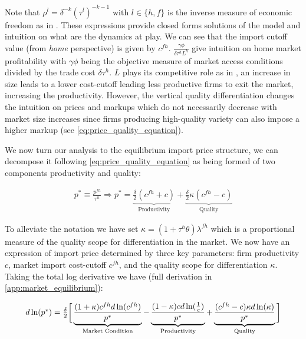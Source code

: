 {Note that $\rho^l = \delta^{-k}(\tau^l)^{-k-1} \text{ with } l \in \{h,f\}$ is the inverse measure of economic freedom as in \citet{melitzMarketSizeTrade2008}. These expressions provide closed forms solutions of the model and intuition on what are the dynamics at play. We can see that the import cutoff value (from \textit{home} perspective) is given by $c^{fh}$. $\frac{\gamma \phi}{\delta \tau^h L^h}$ give intuition on home market profitability with $\gamma \phi$ being the objective measure of market access conditions divided by the trade cost $\delta \tau^h$. $L$ plays its competitive role as in \citet{melitzMarketSizeTrade2008}, an increase in size leads to a lower cost-cutoff leading less productive firms to exit the market, increasing the productivity. However, the vertical quality differentiation changes the intuition on prices and markups which do not necessarily decrease with market size increases since firms producing high-quality variety can also impose a higher markup (see \autoref{eq:price_quality_equation}).

We now turn our analysis to the equilibrium import price structure, we can decompose it following \autoref{eq:price_quality_equation} as being formed of two components productivity and quality: 

\begin{equation} \label{eq:optimal_import_price}
    \begin{aligned}
        p^* \equiv \frac{p^{fh}}{\tau^h} \Longrightarrow p^* = \underbrace{\frac{\delta}{2} ( c^{fh} +  c)}_{\text{Productivity}} + \underbrace{\frac{\delta}{2} \kappa (c^{fh} - c)}_{\text{Quality}}
    \end{aligned}
\end{equation}

To alleviate the notation we have set $\kappa = (1 + \tau^h\theta)\lambda^{fh}$ which is a proportional measure of the quality scope for differentiation in the market. We now have an expression of import price determined by three key parameters: firm productivity $c$, market import cost-cutoff $c^{fh}$, and the quality scope for differentiation $\kappa$. Taking the total log derivative we have (full derivation in \autoref{app:market_equilibrium}): 

\begin{equation} \label{eq:log_derivative_optimal_import_price}
\resizebox{0.9\textwidth}{!}{$
    d \ln(p^*) = \frac{\delta}{2} \bigg[\underbrace{\frac{(1 + \kappa)c^{fh}d\ln(c^{fh})}{p^*}}_{\text{Market Condition}} - \underbrace{\frac{(1 - \kappa)c d\ln(\frac{1}{c})}{p^*}}_{\text{Productivity}} + \underbrace{\frac{(c^{fh} - c)\kappa d\ln(\kappa)}{p^*}}_{\text{Quality}}\bigg] 
    $}
\end{equation}

}
